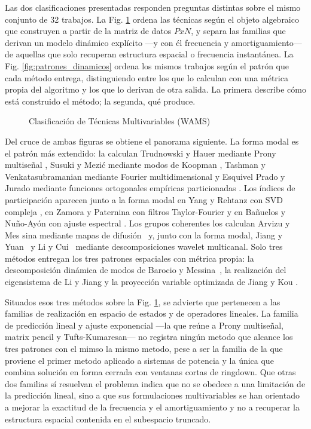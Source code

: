 Las dos clasificaciones presentadas responden preguntas distintas sobre el mismo conjunto de 32 trabajos. 
La Fig. \ref{fig:clasificacion_tecnicas} ordena las técnicas según el objeto algebraico que construyen a partir de la 
matriz de datos $PxN$, y separa las familias que derivan un modelo dinámico explícito —y con él frecuencia y 
amortiguamiento— de aquellas que solo recuperan estructura espacial o frecuencia instantánea. La Fig. 
\ref{fig:patrones_dinamicos} ordena los mismos trabajos según el patrón que cada método entrega, distinguiendo entre los
que lo calculan con una métrica propia del algoritmo y los que lo derivan de otra salida. La primera describe cómo está 
construido el método; la segunda, qué produce.

\begin{figure}[H]
    \centering
     
    \caption{Clasificación de Técnicas Multivariables (WAMS)}
    \label{fig:clasificacion_tecnicas} 
\end{figure}

Del cruce de ambas figuras se obtiene el panorama siguiente. La forma modal es el patrón más extendido: la calculan 
Trudnowski y Hauer mediante Prony multiseñal \cite{Trudnowski1999}, Susuki y Mezić mediante modos de Koopman 
\cite{Susuki2014}, Tashman y Venkatasubramanian mediante Fourier multidimensional \cite{Tashman2014} y Esquivel Prado 
y Jurado mediante funciones ortogonales empíricas particionadas \cite{Esquivel2015}. Los índices de participación 
aparecen junto a la forma modal en Yang y Rehtanz con SVD compleja \cite{Yang2012}, en Zamora y Paternina con filtros 
Taylor-Fourier \cite{Zamora2017} y en Bañuelos y Nuño-Ayón con ajuste espectral \cite{Banuelos2019}. Los grupos 
coherentes los calculan Arvizu y Mes sina mediante mapas de difusión~\cite{Arvizu2016} y, junto con la forma modal, 
Jiang y Yuan~\cite{Jiang2017} y Li y Cui~\cite{Li2018} mediante descomposiciones wavelet multicanal. Solo tres 
métodos entregan los tres patrones espaciales con métrica propia: la descomposición dinámica de modos de Barocio y
Messina~\cite{Barocio2015}, la realización del eigensistema de Li y Jiang \cite{li2020era} y la proyección variable
optimizada de Jiang y Kou \cite{jiang2021}.

Situados esos tres métodos sobre la Fig. \ref{fig:clasificacion_tecnicas}, se advierte que pertenecen a las familias de 
realización en espacio de estados y de operadores lineales. La familia de predicción lineal y ajuste 
exponencial —la que reúne a Prony multiseñal, matrix pencil y Tufts-Kumaresan— no registra ningún metodo que alcance los 
tres patrones con el mimso la mismo metodo, pese a ser la familia de la que proviene el primer metodo aplicado a sistemas de 
potencia y la única que combina solución en forma cerrada con ventanas cortas de ringdown. Que otras dos familias sí 
resuelvan el problema indica que no se obedece a una limitación de la predicción lineal, sino a que 
sus formulaciones multivariables se han orientado a mejorar la exactitud de la frecuencia y el amortiguamiento y no a 
recuperar la estructura espacial contenida en el subespacio truncado.

